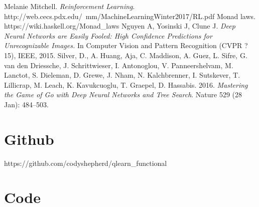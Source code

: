 \documentclass[12pt,a4paper]{article}
\begin{document}
	\pagebreak
	\begin{thebibliography}{9}
		Melanie  Mitchell.
		\textit{Reinforcement Learning}.
		http://web.cecs.pdx.edu/~mm/MachineLearningWinter2017/RL.pdf
		Monad laws.
		https://wiki.haskell.org/Monad\_laws
		Nguyen A, Yosinski J, Clune J. 
		\textit{Deep Neural Networks are Easily Fooled: High Confidence Predictions
for Unrecognizable Images.}
		In Computer Vision and Pattern Recognition (CVPR ?15), IEEE, 2015.
		Silver, D., A. Huang, Aja, C. Maddison, A. Guez, L. Sifre, G. van den Driessche, J. Schrittwieser, I. Antonoglou, V. Panneershelvam, M. Lanctot, S. Dieleman, D. Grewe, J. Nham, N. Kalchbrenner, I. Sutskever, T. Lillicrap, M. Leach, K. Kavukcuoglu, T. Graepel, D. Hassabis. 2016. \textit{Mastering the Game of Go with Deep Neural Networks and Tree Search}. Nature 529 (28 Jan): 484--503.
	\end{thebibliography}
	
	\pagebreak
	\appendix
	\section{Github}
	
	https://github.com/codyshepherd/qlearn\_functional
	
	\section{Code}
	
\end{document}
